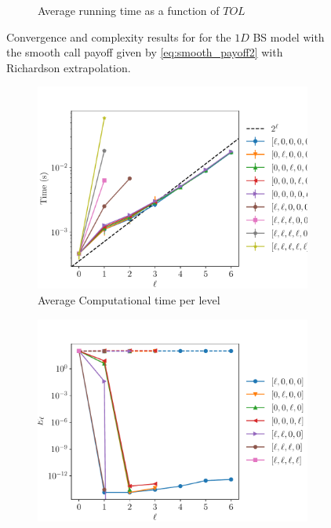 \documentclass[11pt]{article}
\begin{document}
\begin{figure}[!h]
\begin{subfigure}{.5\textwidth}
		\caption{Average running time as a function of $TOL$}
		\label{fig:misc_1D_BS_2_4_steps_smooth_second_payoff_eps_10_5_sub2}
	\end{subfigure}%
	\caption{Convergence and complexity results for for the $1D$ BS model with the smooth call payoff given by \eqref{eq:smooth_payoff2} with Richardson extrapolation.}
	\label{fig:misc_1D_BS_2_4_steps_smooth_second_payoff_eps_10_5_1}
\end{figure}



\begin{figure}[!h]
	\centering
	\begin{subfigure}{.5\textwidth}
		\centering
		\includegraphics[width=0.95\linewidth]{./figures/1D_BS_4_8_steps_smooth_second_payoff_eps_10_5_richardson/level_work.pdf}
		\caption{Average Computational time per level}
		\label{fig:misc_1D_BS_2_4_steps_smooth_second_payoff_eps_10_sub3}
	\end{subfigure}%
	\begin{subfigure}{.5\textwidth}
		\centering
		\includegraphics[width=0.95\linewidth]{./figures/1D_BS_2_4_steps_smooth_second_payoff_eps_10_5_richardson/levels_error_rate.pdf}

\end{subfigure}
\end{figure}
\end{document}
